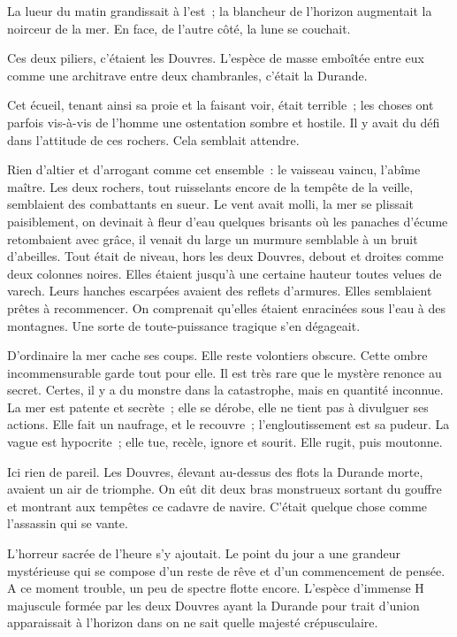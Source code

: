 \documentclass[french,twoside]{book} %
\begin{document}
La lueur du matin grandissait à l’est ; la blancheur de l’horizon augmentait la noirceur de la mer. En face, de l’autre côté, la lune se couchait.\par
Ces deux piliers, c’étaient les Douvres. L’espèce de masse emboîtée entre eux comme une architrave entre deux chambranles, c’était la Durande.\par
Cet écueil, tenant ainsi sa proie et la faisant voir, était terrible ; les choses ont parfois vis-à-vis de l’homme une ostentation sombre et hostile. Il y avait du défi dans l’attitude de ces rochers. Cela semblait attendre.\par
Rien d’altier et d’arrogant comme cet ensemble : le vaisseau vaincu, l’abîme maître. Les deux rochers, tout ruisselants encore de la tempête de la veille, semblaient des combattants en sueur. Le vent avait molli, la mer se plissait paisiblement, on devinait à fleur d’eau quelques brisants où les panaches d’écume retombaient avec grâce, il venait du large un murmure semblable à un bruit d’abeilles. Tout était de niveau, hors les deux Douvres, debout et droites comme deux colonnes noires. Elles étaient jusqu’à une certaine hauteur toutes velues de varech. Leurs hanches escarpées avaient des reflets d’armures. Elles semblaient prêtes à recommencer. On comprenait qu’elles étaient enracinées sous l’eau à des montagnes. Une sorte de toute-puissance tragique s’en dégageait.\par
 D’ordinaire la mer cache ses coups. Elle reste volontiers obscure. Cette ombre incommensurable garde tout pour elle. Il est très rare que le mystère renonce au secret. Certes, il y a du monstre dans la catastrophe, mais en quantité inconnue. La mer est patente et secrète ; elle se dérobe, elle ne tient pas à divulguer ses actions. Elle fait un naufrage, et le recouvre ; l’engloutissement est sa pudeur. La vague est hypocrite ; elle tue, recèle, ignore et sourit. Elle rugit, puis moutonne.\par
Ici rien de pareil. Les Douvres, élevant au-dessus des flots la Durande morte, avaient un air de triomphe. On eût dit deux bras monstrueux sortant du gouffre et montrant aux tempêtes ce cadavre de navire. C’était quelque chose comme l’assassin qui se vante.\par
L’horreur sacrée de l’heure s’y ajoutait. Le point du jour a une grandeur mystérieuse qui se compose d’un reste de rêve et d’un commencement de pensée. A ce moment trouble, un peu de spectre flotte encore. L’espèce d’immense H majuscule formée par les deux Douvres ayant la Durande pour trait d’union apparaissait à l’horizon dans on ne sait quelle majesté crépusculaire.\par
\end{document}
